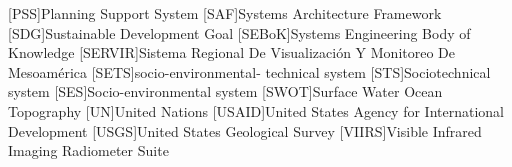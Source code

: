 \begin{acronym}[HyperLEAVES]
[PSS]{Planning Support System}
[SAF]{Systems Architecture Framework}
[SDG]{Sustainable Development Goal}
[SEBoK]{Systems Engineering Body of Knowledge}
[SERVIR]{Sistema Regional De Visualizaci\'{o}n Y Monitoreo De Mesoam\'{e}rica}
[SETS]{socio-environmental-
technical system}
[STS]{Sociotechnical system}
[SES]{Socio-environmental system}
[SWOT]{Surface Water Ocean Topography}
[UN]{United Nations}
[USAID]{United States Agency for International Development}
[USGS]{United States Geological Survey}
[VIIRS]{Visible Infrared Imaging Radiometer Suite}





\end{acronym}


